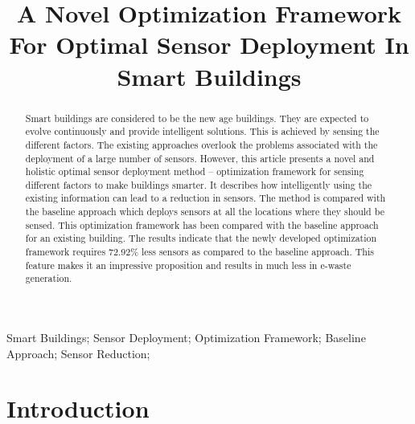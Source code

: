 \documentclass[]{interact}
\theoremstyle{plain}%
\theoremstyle{definition}
\theoremstyle{remark}
\begin{document}

\title{A Novel Optimization Framework For Optimal Sensor Deployment In Smart Buildings }

\author{
}

\maketitle

\begin{abstract}
  Smart buildings are considered to be the new age buildings. They are expected to evolve continuously and provide intelligent solutions. This is achieved by sensing the different factors. The existing approaches overlook the problems associated with the deployment of a large number of sensors. However, this article presents a novel and holistic optimal sensor deployment method -- optimization framework for sensing different factors to make buildings smarter. It describes how intelligently using the existing information can lead to a reduction in sensors. The method is compared with the baseline approach which deploys sensors at all the locations where they should be sensed. This optimization framework has been compared with the baseline approach for an existing building. The results indicate that the newly developed optimization framework requires 72.92\% less sensors as compared to the baseline approach. This feature makes it an impressive proposition and results in much less in e-waste generation. 
\end{abstract}

\begin{keywords}
Smart Buildings; Sensor Deployment; Optimization Framework; Baseline Approach; Sensor Reduction;
\end{keywords}

\section{Introduction}
\end{document}
